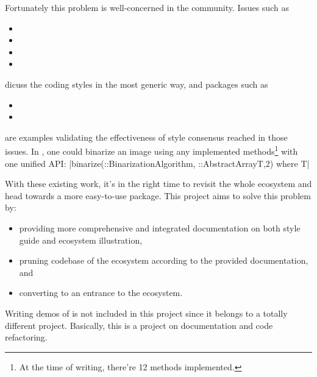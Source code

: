 Fortunately this problem is well-concerned in the community. Issues such as
\begin{itemize}
    \item {}
    \item {}
    \item {}
    \item {}
\end{itemize}
dicuss the coding styles in the most generic way, and packages such as
\begin{itemize}
    \item \repohistogramthresholding
    \item \repoimagebinarization
\end{itemize}
are examples validating the effectiveness of style consensus reached in those issues. In \imagebinarization, one could binarize an image using any implemented methods\footnote{At the time of writing, there're 12 methods implemented.} with one unified API: |binarize(::BinarizationAlgorithm, ::AbstractArray{T,2}) where {T}|

With these existing work, it's in the right time to revisit the whole \images ecosystem and head towards a more easy-to-use \images package. This project aims to solve this problem by:

\begin{itemize}
    \item providing more comprehensive and integrated documentation on both style guide and ecosystem illustration,
    \item pruning codebase of the ecosystem according to the provided documentation, and
    \item converting \images{} to an entrance to the ecosystem.
\end{itemize}

Writing demos of \images{} is not included in this project since it belongs to a totally different project. Basically, this is a project on documentation and code refactoring.
